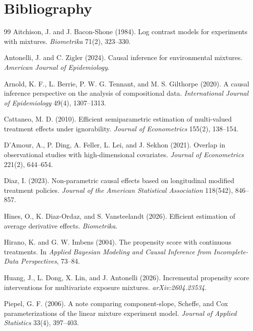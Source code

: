 \documentclass[11pt]{article}
\theoremstyle{definition}
\theoremstyle{plain}
\theoremstyle{remark}
\begin{document}
\section*{Bibliography}
\begin{thebibliography}{99}
Aitchison, J. and J. Bacon-Shone (1984).
Log contrast models for experiments with mixtures.
\emph{Biometrika} 71(2), 323--330.

Antonelli, J. and C. Zigler (2024).
Causal inference for environmental mixtures.
\emph{American Journal of Epidemiology}.

Arnold, K. F., L. Berrie, P. W. G. Tennant, and M. S. Gilthorpe (2020).
A causal inference perspective on the analysis of compositional data.
\emph{International Journal of Epidemiology} 49(4), 1307--1313.

Cattaneo, M. D. (2010).
Efficient semiparametric estimation of multi-valued treatment effects under ignorability.
\emph{Journal of Econometrics} 155(2), 138--154.

D'Amour, A., P. Ding, A. Feller, L. Lei, and J. Sekhon (2021).
Overlap in observational studies with high-dimensional covariates.
\emph{Journal of Econometrics} 221(2), 644--654.

Diaz, I. (2023).
Non-parametric causal effects based on longitudinal modified treatment policies.
\emph{Journal of the American Statistical Association} 118(542), 846--857.

Hines, O., K. Diaz-Ordaz, and S. Vansteelandt (2026).
Efficient estimation of average derivative effects.
\emph{Biometrika}.

Hirano, K. and G. W. Imbens (2004).
The propensity score with continuous treatments.
In \emph{Applied Bayesian Modeling and Causal Inference from Incomplete-Data Perspectives}, 73--84.

Huang, J., L. Dong, X. Lin, and J. Antonelli (2026).
Incremental propensity score interventions for multivariate exposure mixtures.
\emph{arXiv:2604.23534}.

Piepel, G. F. (2006).
A note comparing component-slope, Scheffe, and Cox parameterizations of the linear mixture experiment model.
\emph{Journal of Applied Statistics} 33(4), 397--403.


\end{thebibliography}
\end{document}

